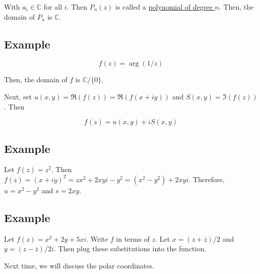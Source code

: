 \documentclass{article}
\newtheorem{one minute paper}[theorem]{One Minute Paper}
\begin{document}
With $a_i \in \mathbb{C}$ for all $i$. Then $P_n(z)$ is called a \underline{polynomial of degree $n$}. Then, the domain of $P_n$ is $\mathbb{C}$. 

\subsection*{Example}

\begin{equation}
    f(z) = \arg(1/z)
\end{equation}

Then, the domain of $f$ is $\mathbb{C}/\{0\}$. 

Next, set $u(x,y) = \Re(f(z)) = \Re(f(x + iy))$ and $S(x,y) = \Im(f(z))$. Then 

\begin{equation}
    f(z) = u(x,y) + iS(x,y)
\end{equation}

\subsection*{Example}

Let $f(z) = z^2$. Then $f(z) = (x + iy)^2 = zx^2 + 2xyi - y^2 = (x^2 - y^2) + 2xyi$. Therefore, $u = x^2 - y^2$ and $s = 2xy$. 

\subsection*{Example}

Let $f(z) = x^2 + 2y + 5xi$. Write $f$ in terms of $z$. Let $x = (z + \overline{z})/2$ and $y = (z - \overline{z})/2i$. Then plug these substitutions into the function. 

Next time, we will discuss the polar coordinates. 
\end{document}
